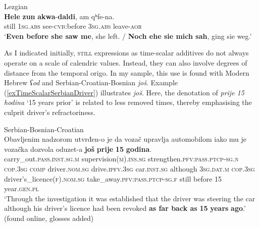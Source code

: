 \begin{exe}
	\ex\label{exContinuativeTTLezgian2}Lezgian\\
	\gll \textbf{Hele} \textbf{zun} \textbf{akwa}-\textbf{daldi}, am qʰfe-na.\\
	still 1\textsc{sg}.\textsc{abs} see-\textsc{cvb}:before 3\textsc{sg}.\textsc{abs} leave-\textsc{aor}\\
	\glt \lq \textbf{Even before she saw me}, she left. / \textbf{Noch ehe sie mich sah}, ging sie weg.' \parencite[90]{Haspelmath1991}
\end{exe}

As I indicated initially, \textsc{still} expressions as time-scalar additives do not always operate on a scale of calendric values. Instead, they can also involve degrees of distance from the temporal origo. In my sample, this use is found with Modern Hebrew \textit{ʕod} and Serbian\hyp Croatian\hyp Bosnian \textit{još}. Example (\ref{exTimeScalarSerbianDriver}) illustrates \textit{još}. Here, the denotation of \textit{prije 15 hodina} \lq 15 years prior\rq{ }is related to less removed times, thereby emphasising the culprit driver's refractoriness. 

\begin{exe}
	\ex Serbian-Bosnian-Croatian\label{exTimeScalarSerbianDriver}\\
	\gll Obavljenim nadzorom utvrđen-o je da vozač upravlja automobilom iako mu je {vozačka dozvola} oduzet-a \textbf{još} \textbf{prije} \textbf{15} \textbf{godina}.\\
	carry\_out.\textsc{pass}.\textsc{inst}.\textsc{sg}.\textsc{m} supervision(\textsc{m}).\textsc{ins}.\textsc{sg} strengthen.\textsc{pfv}:\textsc{pass}.\textsc{ptcp}-\textsc{sg}.\textsc{n} \textsc{cop}.3\textsc{sg} \textsc{comp} driver.\textsc{nom}.\textsc{sg} drive.\textsc{ipfv}.3\textsc{sg} car.\textsc{inst}.\textsc{sg} although 3\textsc{sg}.\textsc{dat}.\textsc{m} \textsc{cop}.3\textsc{sg} driver's\_licence(\textsc{f}).\textsc{nom}.\textsc{sg}  take\_away.\textsc{pfv}:\textsc{pass}.\textsc{ptcp}-\textsc{sg}.\textsc{f} still before 15 year.\textsc{gen}.\textsc{pl}\\
	\glt \lq Through the investigation it was established that the driver was steering the car although his driver's licence had been revoked \textbf{as far back as} \textbf{15} \textbf{years} \textbf{ago}.' (found online, glosses added)%
\end{exe}

